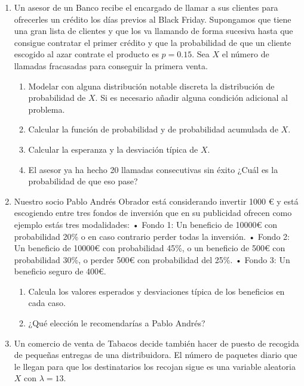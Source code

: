 \documentclass[
]{article}
\providecommand{\tightlist}{%
  \setlength{\itemsep}{0pt}\setlength{\parskip}{0pt}}
\begin{document}
\begin{enumerate}
\def\labelenumi{\arabic{enumi}.}
\setcounter{enumi}{3}
\tightlist
\item
  Un asesor de un Banco recibe el encargado de llamar a sus clientes
  para ofrecerles un crédito los días previos al Black Friday.
  Supongamos que tiene una gran lista de clientes y que los va llamando
  de forma sucesiva hasta que consigue contratar el primer crédito y que
  la probabilidad de que un cliente escogido al azar contrate el
  producto es \(p=0.15\). Sea \(X\) el número de llamadas fracasadas
  para conseguir la primera venta.

  \begin{enumerate}
  \def\labelenumii{\alph{enumii}.}
  \tightlist
  \item
    Modelar con alguna distribución notable discreta la distribución de
    probabilidad de \(X\). Si es necesario añadir alguna condición
    adicional al problema.
  \item
    Calcular la función de probabilidad y de probabilidad acumulada de
    \(X\).
  \item
    Calcular la esperanza y la desviación típica de \(X\).
  \item
    El asesor ya ha hecho 20 llamadas consecutivas sin éxito ¿Cuál es la
    probabilidad de que eso pase?
  \end{enumerate}
\item
  Nuestro socio Pablo Andrés Obrador está considerando invertir 1000 € y
  está escogiendo entre tres fondos de inversión que en su publicidad
  ofrecen como ejemplo estás tres modalidades: • Fondo 1: Un beneficio
  de 10000€ con probabilidad 20\% o en caso contrario perder todas la
  inversión. • Fondo 2: Un beneficio de 10000€ con probabilidad 45\%, o
  un beneficio de 500€ con probabilidad 30\%, o perder 500€ con
  probabilidad del 25\%. • Fondo 3: Un beneficio seguro de 400€.

  \begin{enumerate}
  \def\labelenumii{\alph{enumii}.}
  \tightlist
  \item
    Calcula los valores esperados y desviaciones típica de los
    beneficios en cada caso.
  \item
    ¿Qué elección le recomendarías a Pablo Andrés?
  \end{enumerate}
\item
  Un comercio de venta de Tabacos decide también hacer de puesto de
  recogida de pequeñas entregas de una distribuidora. El número de
  paquetes diario que le llegan para que los destinatarios los recojan
  sigue es una variable aleatoria \(X\) con \(\lambda=13\).


\end{enumerate}
\end{document}
